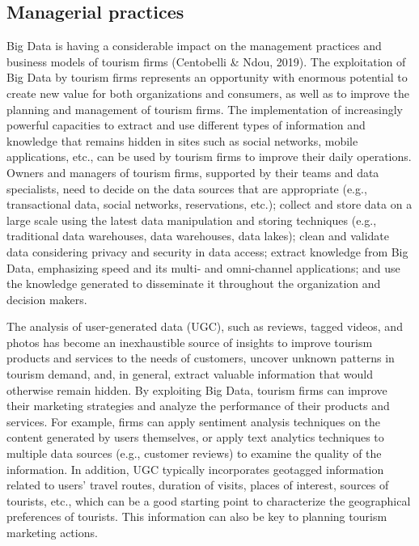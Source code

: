 \documentclass[
  letterpaper,
  DIV=11,
  numbers=noendperiod]{scrreprt}
\begin{document}
\hypertarget{managerial-practices}{%
\subsection{Managerial practices}\label{managerial-practices}}

Big Data is having a considerable impact on the management practices and
business models of tourism firms (Centobelli \& Ndou, 2019). The
exploitation of Big Data by tourism firms represents an opportunity with
enormous potential to create new value for both organizations and
consumers, as well as to improve the planning and management of tourism
firms. The implementation of increasingly powerful capacities to extract
and use different types of information and knowledge that remains hidden
in sites such as social networks, mobile applications, etc., can be used
by tourism firms to improve their daily operations. Owners and managers
of tourism firms, supported by their teams and data specialists, need to
decide on the data sources that are appropriate (e.g., transactional
data, social networks, reservations, etc.); collect and store data on a
large scale using the latest data manipulation and storing techniques
(e.g., traditional data warehouses, data warehouses, data lakes); clean
and validate data considering privacy and security in data access;
extract knowledge from Big Data, emphasizing speed and its multi- and
omni-channel applications; and use the knowledge generated to
disseminate it throughout the organization and decision makers.

The analysis of user-generated data (UGC), such as reviews, tagged
videos, and photos has become an inexhaustible source of insights to
improve tourism products and services to the needs of customers, uncover
unknown patterns in tourism demand, and, in general, extract valuable
information that would otherwise remain hidden. By exploiting Big Data,
tourism firms can improve their marketing strategies and analyze the
performance of their products and services. For example, firms can apply
sentiment analysis techniques on the content generated by users
themselves, or apply text analytics techniques to multiple data sources
(e.g., customer reviews) to examine the quality of the information. In
addition, UGC typically incorporates geotagged information related to
users' travel routes, duration of visits, places of interest, sources of
tourists, etc., which can be a good starting point to characterize the
geographical preferences of tourists. This information can also be key
to planning tourism marketing actions.
\end{document}
